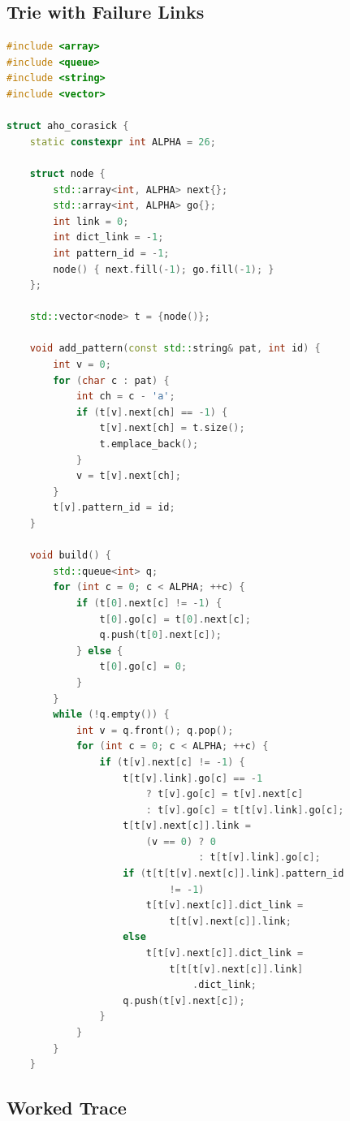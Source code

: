\subsection{Trie with Failure Links}

\begin{lstlisting}[language=C++]
#include <array>
#include <queue>
#include <string>
#include <vector>

struct aho_corasick {
    static constexpr int ALPHA = 26;

    struct node {
        std::array<int, ALPHA> next{};
        std::array<int, ALPHA> go{};
        int link = 0;
        int dict_link = -1;
        int pattern_id = -1;
        node() { next.fill(-1); go.fill(-1); }
    };

    std::vector<node> t = {node()};

    void add_pattern(const std::string& pat, int id) {
        int v = 0;
        for (char c : pat) {
            int ch = c - 'a';
            if (t[v].next[ch] == -1) {
                t[v].next[ch] = t.size();
                t.emplace_back();
            }
            v = t[v].next[ch];
        }
        t[v].pattern_id = id;
    }

    void build() {
        std::queue<int> q;
        for (int c = 0; c < ALPHA; ++c) {
            if (t[0].next[c] != -1) {
                t[0].go[c] = t[0].next[c];
                q.push(t[0].next[c]);
            } else {
                t[0].go[c] = 0;
            }
        }
        while (!q.empty()) {
            int v = q.front(); q.pop();
            for (int c = 0; c < ALPHA; ++c) {
                if (t[v].next[c] != -1) {
                    t[t[v].link].go[c] == -1
                        ? t[v].go[c] = t[v].next[c]
                        : t[v].go[c] = t[t[v].link].go[c];
                    t[t[v].next[c]].link =
                        (v == 0) ? 0
                                 : t[t[v].link].go[c];
                    if (t[t[t[v].next[c]].link].pattern_id
                            != -1)
                        t[t[v].next[c]].dict_link =
                            t[t[v].next[c]].link;
                    else
                        t[t[v].next[c]].dict_link =
                            t[t[t[v].next[c]].link]
                                .dict_link;
                    q.push(t[v].next[c]);
                }
            }
        }
    }
\end{lstlisting}

\subsection{Worked Trace}

